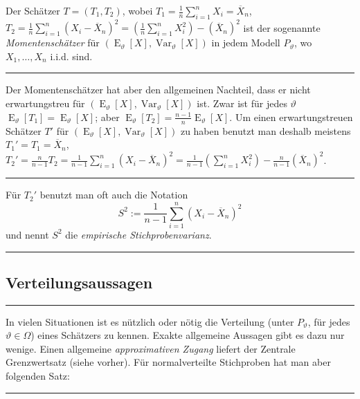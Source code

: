 \documentclass[a4paper, 12pt]{extarticle}
\newcommand{\sep}{\vspace{5pt}\noindent\hrule\vspace{5pt}}
\newcommand{\Var}[2][]{\operatorname{Var}_{#1}\left[ #2 \right]}
\newcommand{\Exp}[2][]{\operatorname{E}_{#1}\left[ #2 \right]}
\begin{document}
\begin{multicols*}{2}
\Def[Momentenschätzer] Der Schätzer $T=(T_1,T_2)$, wobei
$
T_1=\frac{1}{n}\sum_{i=1}^n X_i = \overline{X}_n$,
$
T_2=\frac{1}{n}\sum_{i=1}^n (X_i-\overline{X}_n)^2
=\left(\frac{1}{n}\sum_{i=1}^n X_i^2\right) - \left(\overline{X}_n\right)^2 
$
ist der sogenannte \emph{Momentenschätzer} für
$
(\Exp[\vartheta]{X},\Var[\vartheta]{X})
$
in jedem Modell $P_\vartheta$, wo $X_1,\ldots,X_n$ i.i.d. sind. 

\sep


Der Momentenschätzer hat aber den allgemeinen Nachteil, dass er nicht
erwartungstreu für $(\Exp[\vartheta]{X},\Var[\vartheta]{X})$ ist. Zwar ist für
jedes $\vartheta$
$
\Exp[\vartheta]{T_1}=\Exp[\vartheta]{X}$; aber
$\Exp[\vartheta]{T_2}=\frac{n-1}{n}\Exp[\vartheta]{X}$.
Um einen erwartungstreuen Schätzer $T'$ für
$(\Exp[\vartheta]{X},\Var[\vartheta]{X})$ zu haben benutzt man deshalb meistens
$T_1'=T_1=\overline{X}_n$,\\
$T_2'=\frac{n}{n-1}T_2 
= \frac{1}{n-1}\sum_{i=1}^n(X_i-\overline{X}_n)^2
=\frac{1}{n-1}\left(\sum_{i=1}^n X_i^2\right)
-\frac{n}{n-1}\left(\overline{X}_n\right)^2$.

\sep

 Für $T_2'$ benutzt man oft auch die Notation
\[
S^2:=\frac{1}{n-1}\sum_{i=1}^n(X_i-\overline{X}_n)^2
\]
und nennt $S^2$ die \emph{empirische Stichprobenvarianz}.

\sep

\subsection{Verteilungsaussagen}

\sep

In vielen Situationen ist es nützlich oder nötig die Verteilung (unter
$P_\vartheta$, für jedes $\vartheta\in\Omega$) eines Schätzers zu kennen. Exakte
allgemeine Aussagen gibt es dazu nur wenige. Einen allgemeine
\emph{approximativen Zugang} liefert der Zentrale Grenzwertsatz (siehe vorher).
Für normalverteilte Stichproben hat man aber folgenden Satz:

\sep


\end{multicols*}
\end{document}

